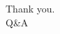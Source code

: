 \documentclass[dvipsnames, 10pt]{beamer}
\begin{document}
\begin{frame}\centering\frametitle{}
    \vspace{2.5cm}
    \Huge{Thank you.}\\
    \vspace{1cm}
    \Large{Q\&A}
\end{frame}
\end{document}

